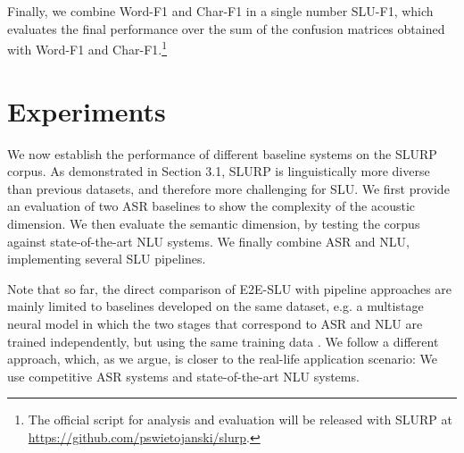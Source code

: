 \documentclass[11pt,a4paper]{article}
\newcommand{\metricname}{SLU-F1}
\newcommand{\werm}{Word-F1}
\newcommand{\levm}{Char-F1}
\newcommand{\datasetacr}{SLURP}
\newcommand{\etoe}{E2E}
\newcommand{\slu}{SLU}
\newcommand{\asr}{ASR}
\newcommand{\nlu}{NLU}
\begin{document}
Finally, we combine \werm{} and \levm{} in a single number
\metricname, which evaluates the final performance over the sum of the confusion matrices obtained with \werm{} and \levm.\footnote{The official script for analysis and evaluation will be released with SLURP at \url{https://github.com/pswietojanski/slurp}.} 

\section{Experiments}
\label{sec:results}
We now establish the performance of different baseline systems on the \datasetacr{} corpus. As demonstrated in Section 3.1, \datasetacr{} is  linguistically more diverse than previous datasets, and therefore more challenging for \slu.
We first provide an evaluation of two \asr{} baselines to show the complexity of the acoustic dimension.
We then evaluate the semantic dimension, by testing the corpus against state-of-the-art \nlu{} systems.
We finally combine \asr{} and \nlu, implementing several \slu{} pipelines.



Note that so far, the direct comparison of \etoe-\slu{} with pipeline approaches are mainly limited to baselines developed on the same dataset, e.g. a multistage neural model in which the two stages that correspond to
\asr{} and \nlu{} are trained independently, but using the same training data \cite{desot:asru2019,Haghani2018:FromAT}. We follow a different approach, which, as we argue, is closer to the real-life application scenario: We use competitive \asr{} systems  and state-of-the-art \nlu{} systems.
\end{document}

